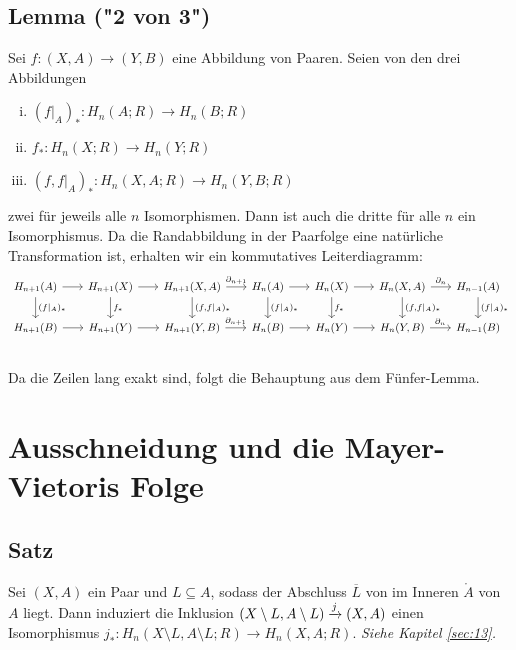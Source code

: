 \subsection{Lemma ("2 von 3")} %
\label{sub:816}
Sei $f \colon (X,A) \to (Y,B)$ eine Abbildung von Paaren. Seien von den drei Abbildungen
\begin{enumerate}[(i)]
	\item $(f|_A)_* \colon  H_n(A;R) \to H_n(B;R)$
	\item $f_* \colon H_n(X;R) \to H_n(Y;R)$
	\item $(f,f|_A)_* \colon H_n(X,A;R) \to H_n(Y,B;R)$
\end{enumerate}
zwei für jeweils alle $n$ Isomorphismen. Dann ist auch die dritte für alle $n$ ein Isomorphismus.
Da die Randabbildung in der Paarfolge eine natürliche Transformation ist, erhalten wir ein kommutatives Leiterdiagramm:
\[
	\begin{tikzcd}[column sep=1.7em, font=\small]
		H_{n+1}(A) \rar \dar["{(f|_A)_*}"] & H_{n+1}(X) \rar \dar["f_*"] & H_{n+1}(X,A) \rar["\partial_{n+1}"] \dar["{(f,f|_A)_*}"] & H_n(A) \rar \dar["(f|_A)_*"] & H_n(X) \rar \dar["f_*"] & H_n(X,A) \rar["\partial_n"] \dar["{(f,f|_A)_*}"] & H_{n-1}(A) \dar["{(f|_A)_*}"] \\
		H_{n+1}(B) \rar & H_{n+1}(Y) \rar & H_{n+1}(Y,B) \rar["\partial_{n+1}"] & H_n(B) \rar & H_n(Y) \rar & H_n(Y,B) \rar["\partial_n"] & H_{n-1}(B) \\
	\end{tikzcd}
\]
Da die Zeilen lang exakt sind, folgt die Behauptung aus dem Fünfer-Lemma. \bewende
\newpage

\section{Ausschneidung und die Mayer-Vietoris Folge} %
\label{sec:9}

\subsection[Satz: Ausschneidungsisomorphismus]{Satz} %
\label{sub:91}
Sei $(X,A)$ ein Paar und $L \subseteq A$, sodass der Abschluss $\overline{L}$ von im Inneren $\mathring{A}$ von $A$ liegt. Dann induziert die Inklusion
$\enbrace*{X \setminus L, A \setminus L} \xrightarrow{j} (X,A)$ einen Isomorphismus $j_* \colon H_n(X \setminus L, A \setminus L;R) \to H_n(X,A;R)$.
\emph{Siehe Kapitel \ref{sec:13}.}

